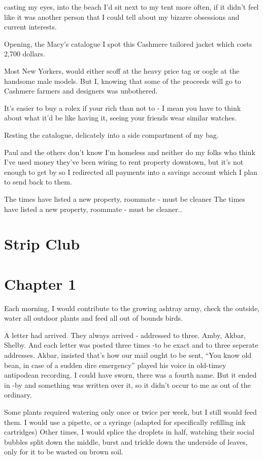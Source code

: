 \documentclass[19pt,openany]{book}
\begin{document}
casting my eyes, into the beach
I'd sit next to my tent more
often, if it didn't feel like
it was another person that
I could tell
about my bizarre obsessions and
current interests.

Opening, the Macy's catalogue
I spot this Cashmere tailored
jacket which costs 2,700 dollars.

Most New Yorkers, would either
scoff at the heavy price tag
or oogle at the handsome male models.
But I, knowing that some of the proceeds
will go to Cashmere farmers and designers
was unbothered.

It's easier to buy a rolex
if your rich than not to - I mean
you have to think about what it'd
be like having it, seeing your
friends wear similar watches.

Resting the catalogue, delicately
into a side compartment of my bag.

Paul and the others don't know
I'm homeless and neither do my
folks who think I've used
money they've been wiring
to rent property downtown, but
it's not enough to get by
so I redirected all payments
into a savings account which
I plan to send back to them.

The times have listed
a new property, roommate -
must be cleaner
The times have listed
a new property, roommate -
must be cleaner..

\chapter{Strip Club}

\chapter*{Chapter 1}

Each morning, I would contribute
to the growing ashtray army,
check the outside, water
all outdoor plants and feed all out
of bounds
birds.

A letter had arrived. They always
arrived - addressed to three. Amby, Akbar,
Shelby. And each letter
was posted three times -to be
exact and to three seperate addresses.
Akbar, insisted that's how our mail
ought to be sent, ``You know old bean,
in case of a sudden dire emergency''
played his voice in old-timey
antipodean recording. I could have
sworn, there was a fourth name. But
it ended in -by and something was written
over it, so it didn't occur to me
as out of the ordinary.

Some plants required watering only once
or twice per week, but I still would
feed them. I would use a pipette, or a
syringe (adapted for specifically refilling ink cartridges)
Other times, I would splice the droplets
in half, watching their social bubbles split
down the middle,
burst and trickle down the underside of leaves,
only for it to be wasted on brown soil.
\end{document}
